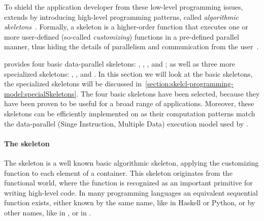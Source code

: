To shield the application developer from these low-level programming issues, \SkelCL extends \OpenCL by introducing high-level programming patterns, called \emph{algorithmic skeletons}~\cite{Cole1991}.
Formally, a skeleton is a higher-order function that executes one or more user-defined (so-called \emph{customizing}) functions in a pre-defined parallel manner, thus hiding the details of parallelism and communication from the user~\cite{GorlatchCo2011}.

\SkelCL provides four basic data-parallel skeletons: \map, \zip, \reduce, and \scan;
as well as three more specialized skeletons: \mapOverlap, \stencil, and \allpairs.
In this section we will look at the basic skeletons, the specialized skeletons will be discussed in~\autoref{section:skelcl-programming-model:specialSkeletons}.
The four basic skeletons have been selected, because they have been proven to be useful for a broad range of applications.
Moreover, these skeletons can be efficiently implemented on \GPUs as their computation patterns match the data-parallel \SIMD (Singe Instruction, Multiple Data) execution model used by \GPUs.


\paragraph{The \map skeleton}
The \map skeleton is a well known basic algorithmic skeleton, applying the customizing function to each element of a container.
This skeleton originates from the functional world, where the  function is recognized as an important primitive for writing high-level code.
In many programming languages an equivalent sequential function exists, either known by the same name, like in Haskell or Python, or by other names, like  in \Cpp, or  in \Csharp.

